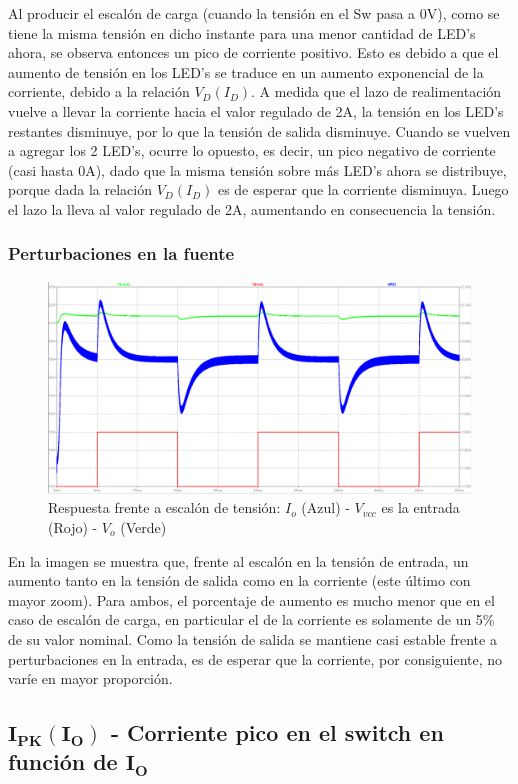 \documentclass[e4_tp2_main.tex]{subfiles}
\begin{document}
Al producir el escalón de carga (cuando la tensión en el Sw pasa a 0V), como se tiene la misma tensión en dicho instante para una menor cantidad de LED's ahora, se observa entonces un pico de corriente positivo. Esto es debido a que el aumento de tensión en los LED's se traduce en un aumento exponencial de la corriente, debido a la relación $V_D(I_D)$. A medida que el lazo de realimentación vuelve a llevar la corriente hacia el valor regulado de 2A, la tensión en los LED's restantes disminuye, por lo que la tensión de salida disminuye. Cuando se vuelven a agregar los 2 LED's, ocurre lo opuesto, es decir, un pico negativo de corriente (casi hasta 0A), dado que la misma tensión sobre más LED's ahora se distribuye, porque dada la relación $V_D(I_D)$ es de esperar que la corriente disminuya. Luego el lazo la lleva al valor regulado de 2A, aumentando en consecuencia la tensión.

\subsubsection*{Perturbaciones en la fuente}
\begin{figure}[H]
\centering
\includegraphics[width=0.7\linewidth]{Imagenes/Punto2/fuentevariable-I-V.PNG}
\caption{Respuesta frente a escalón de tensión: $I_o$ (Azul) - $V_{vcc}$ es la entrada (Rojo) - $V_o$ (Verde)}
\end{figure}

En la imagen se muestra que, frente al escalón en la tensión de entrada, un aumento tanto en la tensión de salida como en la corriente (este último con mayor zoom). Para ambos, el porcentaje de aumento es mucho menor que en el caso de escalón de carga, en particular el de la corriente es solamente de un 5\% de su valor nominal. Como la tensión de salida se mantiene casi estable frente a perturbaciones en la entrada, es de esperar que la corriente, por consiguiente, no varíe en mayor proporción.

\newpage

\subsection*{$\mathbf{I_{PK}(I_O)}$ - Corriente pico en el switch en función de $\mathbf{I_O}$}
\end{document}
